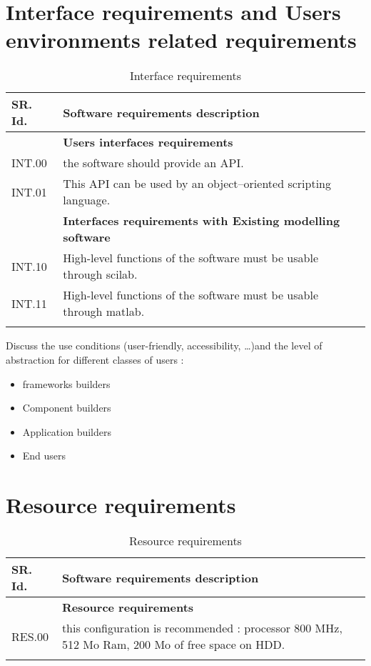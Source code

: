 \section{Interface requirements and Users environments related requirements}
\begin{longtable}{%
    |>{\columncolor[gray]{.8}}p{}%
    |>{\columncolor[gray]{.95}}p{}|}
  \hline
  \rowcolor[gray]{.8}   SR. Id. & Software requirements description \\
  \hline 
  & \textbf{Users interfaces requirements }\\
  \hline
  INT.00 & the software should provide an API. \\
  INT.01 & This API can be used by an object--oriented scripting language.\\
  \hline 
  & \textbf{Interfaces requirements with Existing modelling software }\\ 
  \hline
  INT.10 & High-level functions of the software must be usable through \ac{scilab}.  \\
  INT.11 & High-level functions of the software must be usable through \ac{matlab}.  \\
  \hline
  \caption{Interface requirements}\\
\end{longtable}


Discuss the use conditions (user-friendly, accessibility, \ldots)and the level of abstraction for different classes of users :
\begin{itemize}
\item frameworks builders
\item Component builders 
\item Application builders
\item End users
\end{itemize}

\section{Resource requirements}
\begin{longtable}{%
|>{\columncolor[gray]{.8}}p{}%
|>{\columncolor[gray]{.95}}p{}|}
   \hline
\rowcolor[gray]{.8}   SR. Id. & Software requirements description \\
      \hline 
   & \textbf{Resource requirements }\\
   \hline
   RES.00 &  this configuration is recommended : processor 800 MHz, 512 Mo Ram, 200 Mo of free space on HDD.\\
\hline
\caption{Resource requirements}
\end{longtable}
